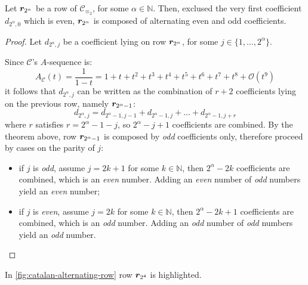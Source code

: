 \begin{theorem}
    Let $\boldsymbol{r}_{2^{\alpha}}$ be a row of $\mathcal{C}_{\equiv_{2}}$, 
    for some $\alpha\in\mathbb{N}$. Then, exclused the very first coefficient 
        $d_{2^{\alpha},0}$ which is even, $\boldsymbol{r}_{2^{\alpha}}$ is composed of
        alternating even and odd coefficients.
\end{theorem}

\begin{proof}
    Let $d_{2^{\alpha},j}$ be a coefficient lying on row $\boldsymbol{r}_{2^{\alpha}}$,
    for some $j\in\lbrace1,\ldots,2^{\alpha}\rbrace$.

    Since $\mathcal{C}$'s $A$-sequence is:
    \begin{displaymath}
        A_{\mathcal{C}}(t)=\frac{1}{1-t}=1+t+t^{2}+t^{3}+t^{4}+t^{5}+t^{6}+t^{7}+t^{8}+
            \mathcal{O}(t^{9})
    \end{displaymath}
    it follows that $d_{2^{\alpha},j}$ can be written as the combination of $r+2$
    coefficients lying on the previous row, namely $\boldsymbol{r}_{2^{\alpha}-1}$:
    \begin{displaymath}
        d_{2^{\alpha},j} = d_{2^{\alpha}-1,j-1} +d_{2^{\alpha}-1,j} +\ldots+d_{2^{\alpha}-1,j+r} 
    \end{displaymath}
    where $r$ satisfies $r=2^{\alpha}-1-j$, so $2^{\alpha}-j+1$ coefficients are 
    combined.  By 
    the theorem above, row $\boldsymbol{r}_{2^{\alpha}-1}$ is composed by \emph{odd}
    coefficients only, therefore proceed by cases on the parity of $j$:
    \begin{itemize}
        \item if $j$ is \emph{odd}, assume $j=2k+1$ for some $k\in\mathbb{N}$, then
            $2^{\alpha}-2k$ coefficients are combined, which is an \emph{even} number. 
            Adding an \emph{even} number of \emph{odd} numbers yield an \emph{even} number;
        \item if $j$ is \emph{even}, assume $j=2k$ for some $k\in\mathbb{N}$, then
            $2^{\alpha}-2k+1$ coefficients are combined, which is an \emph{odd} number. 
            Adding an \emph{odd} number of \emph{odd} numbers yield an \emph{odd} number.
    \end{itemize}
\end{proof}


In \autoref{fig:catalan-alternating-row} row $\boldsymbol{r}_{2^{4}}$ is highlighted.

